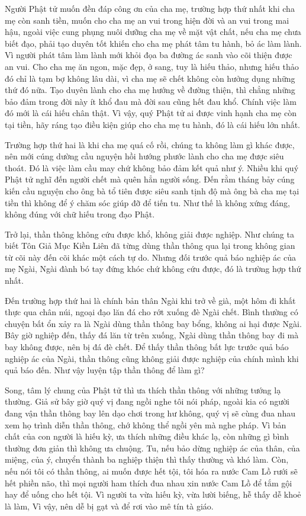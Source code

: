 \documentclass[
  12pt,
  oneside]{book}
\begin{document}
Người Phật tử muốn đền đáp công ơn của cha mẹ, trường hợp thứ nhất khi cha mẹ còn sanh tiền, muốn cho cha mẹ an vui trong hiện đời và an vui trong mai hậu, ngoài việc cung phụng nuôi dưỡng cha mẹ về mặt vật chất, nếu cha mẹ chưa biết đạo, phải tạo duyên tốt khiến cho cha mẹ phát tâm tu hành, bỏ ác làm lành. Vì người phát tâm làm lành mới khỏi đọa ba đường ác sanh vào cõi thiện được an vui. Cho cha mẹ ăn ngon, mặc đẹp, ở sang, tuy là hiếu thảo, nhưng hiếu thảo đó chỉ là tạm bợ không lâu dài, vì cha mẹ sẽ chết không còn hưởng dụng những thứ đó nữa. Tạo duyên lành cho cha mẹ hướng về đường thiện, thì chẳng những bảo đảm trong đời này ít khổ đau mà đời sau cũng hết đau khổ. Chính việc làm đó mới là cái hiếu chân thật. Vì vậy, quý Phật tử ai được vinh hạnh cha mẹ còn tại tiền, hãy ráng tạo điều kiện giúp cho cha mẹ tu hành, đó là cái hiếu lớn nhất.

Trường hợp thứ hai là khi cha mẹ quá cố rồi, chúng ta không làm gì khác được, nên mới cúng dường cầu nguyện hồi hướng phước lành cho cha mẹ được siêu thoát. Đó là việc làm cầu may chứ không bảo đảm kết quả như ý. Nhiều khi quý Phật tử nghĩ đến người chết mà quên hẳn người sống. Đến rằm tháng bảy cúng kiến cầu nguyện cho ông bà tổ tiên được siêu sanh tịnh độ mà ông bà cha mẹ tại tiền thì không để ý chăm sóc giúp đỡ để tiến tu. Như thế là không xứng đáng, không đúng với chữ hiếu trong đạo Phật.

Trở lại, thần thông không cứu được khổ, không giải được nghiệp. Như chúng ta biết Tôn Giả Mục Kiền Liên đã từng dùng thần thông qua lại trong không gian từ cõi này đến cõi khác một cách tự do. Nhưng đối trước quả báo nghiệp ác của mẹ Ngài, Ngài đành bó tay đứng khóc chứ không cứu được, đó là trường hợp thứ nhất.

Đến trường hợp thứ hai là chính bản thân Ngài khi trở về già, một hôm đi khất thực qua chân núi, ngoại đạo lăn đá cho rớt xuống đè Ngài chết. Bình thường có chuyện bất ổn xảy ra là Ngài dùng thần thông bay bổng, không ai hại được Ngài. Bây giờ nghiệp đến, thấy đá lăn từ trên xuống, Ngài dùng thần thông bay đi mà bay không được, nên bị đá đè chết. Để thấy thần thông bất lực trước quả báo nghiệp ác của Ngài, thần thông cũng không giải được nghiệp của chính mình khi quả báo đến. Như vậy luyện tập thần thông để làm gì?

Song, tâm lý chung của Phật tử thì ưa thích thần thông với những tướng lạ thường. Giả sử bây giờ quý vị đang ngồi nghe tôi nói pháp, ngoài kia có người đang vận thần thông bay lên dạo chơi trong hư không, quý vị sẽ cùng đua nhau xem họ trình diễn thần thông, chớ không thể ngồi yên mà nghe pháp. Vì bản chất của con người là hiếu kỳ, ưa thích những điều khác lạ, còn những gì bình thường đơn giản thì không ưa chuộng. Tu, nếu bảo dừng nghiệp ác của thân, của miệng, của ý, chuyển thành ba nghiệp thiện thì thấy thường và khó làm. Còn, nếu nói tôi có thần thông, ai muốn được hết tội, tôi hóa ra nước Cam Lồ rưới sẽ hết phiền não, thì mọi người ham thích đua nhau xin nước Cam Lồ để tắm gội hay để uống cho hết tội. Vì người ta vừa hiếu kỳ, vừa lười biếng, hễ thấy dễ khoẻ là làm, Vì vậy, nên dễ bị gạt và để rơi vào mê tín tà giáo.
\end{document}
